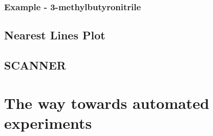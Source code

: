 \documentclass[11pt]{article}
\begin{document}





\subsubsection{Example - 3-methylbutyronitrile}


\subsection{Nearest Lines Plot}


\subsection{SCANNER}



\section{The way towards automated experiments}
\end{document}
